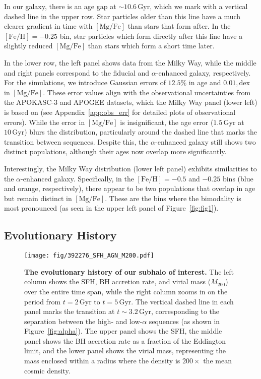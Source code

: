 \documentclass[twocolumn]{aastex631}
\newcommand{\Gyr}{\ensuremath{\textrm{Gyr}}}
\newcommand{\FeH}{\ensuremath{[\textrm{Fe}/\textrm{H}]}}
\newcommand{\MgFe}{\ensuremath{[\textrm{Mg}/\textrm{Fe}]}}
\newcommand{\dex}{\ensuremath{\textrm{dex}}}
\begin{document}
In our galaxy, there is an age gap at $\sim10.6\,\Gyr$, which we mark with a vertical dashed line in the upper row. Star particles older than this line have a much clearer gradient in time with \MgFe{} than stars that form after. In the $\FeH=-0.25$ bin, star particles which form directly after this line have a slightly reduced \MgFe{} than stars which form a short time later.

In the lower row, the left panel shows data from the Milky Way, while the middle and right panels correspond to the fiducial and $\alpha$-enhanced galaxy, respectively. For the simulations, we introduce Gaussian errors of $12.5\%$ in age and $0.01,\dex$ in \MgFe{}. These error values align with the observational uncertainties from the APOKASC-3 and APOGEE datasets, which the Milky Way panel (lower left) is based on (see Appendix~\ref{app:obs_err} for detailed plots of observational errors). While the error in \MgFe{} is insignificant, the age error ($1.5\,\Gyr$ at $10\,\Gyr$) blurs the distribution, particularly around the dashed line that marks the transition between sequences. Despite this, the $\alpha$-enhanced galaxy still shows two distinct populations, although their ages now overlap more significantly.

Interestingly, the Milky Way distribution (lower left panel) exhibits similarities to the $\alpha$-enhanced galaxy. Specifically, in the $\FeH=-0.5$ and $-0.25$ bins (blue and orange, respectively), there appear to be two populations that overlap in age but remain distinct in \MgFe{}. These are the bins where the bimodality is most pronounced (as seen in the upper left panel of Figure~\ref{fig:fig1}).

\subsection{Evolutionary History}\label{ssec:evol}
\begin{figure}
  \centering
  \texttt{[image: fig/392276\_SFH\_AGN\_M200.pdf]}
  \caption{\textbf{The evolutionary history of our subhalo of interest.} The left column shows the SFH, BH accretion rate, and virial mass ($M_{200}$) over the entire time span, while the right column zooms in on the period from $t=2\,\Gyr$ to $t=5\,\Gyr$. The vertical dashed line in each panel marks the transition at $t\sim3.2\,\Gyr$, corresponding to the separation between the high- and low-$\alpha$ sequences (as shown in Figure~\ref{fig:alpha}). The upper panel shows the SFH, the middle panel shows the BH accretion rate as a fraction of the Eddington limit, and the lower panel shows the virial mass, representing the mass enclosed within a radius where the density is $200\times$ the mean cosmic density.}
  \label{fig:history}
\end{figure}
\end{document}
